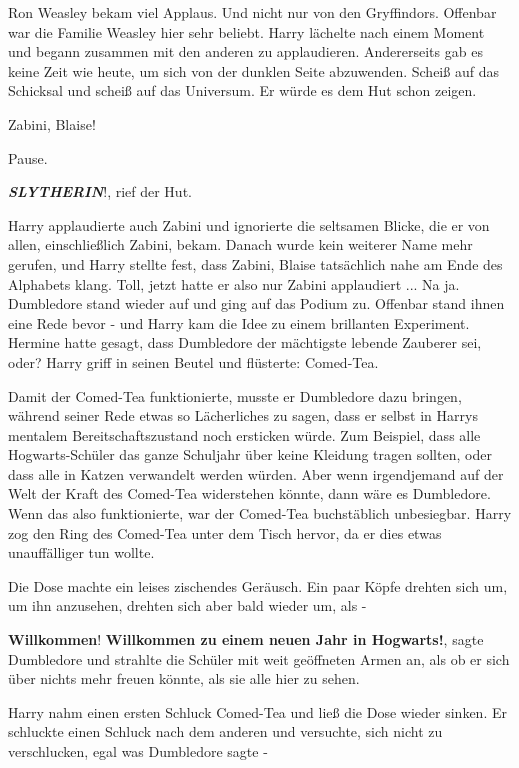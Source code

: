 Ron Weasley bekam viel Applaus. Und nicht nur von den Gryffindors. Offenbar war
die Familie Weasley hier sehr beliebt. Harry lächelte nach einem Moment und
begann zusammen mit den anderen zu applaudieren. Andererseits gab es keine Zeit
wie heute, um sich von der dunklen Seite abzuwenden. Scheiß auf das Schicksal
und scheiß auf das Universum. Er würde es dem Hut schon zeigen.

\glqq{}Zabini, Blaise!\grqq{}

Pause.

\glqq{}\textbf{\emph{SLYTHERIN}}!\grqq{}, rief der Hut.

Harry applaudierte auch Zabini und ignorierte die seltsamen Blicke, die er von
allen, einschließlich Zabini, bekam. Danach wurde kein weiterer Name mehr
gerufen, und Harry stellte fest, dass \glqq{}Zabini, Blaise\grqq{} tatsächlich
nahe am Ende des Alphabets klang. Toll, jetzt hatte er also nur Zabini
applaudiert ... Na ja. Dumbledore stand wieder auf und ging auf das Podium zu.
Offenbar stand ihnen eine Rede bevor - und Harry kam die Idee zu einem
brillanten Experiment. Hermine hatte gesagt, dass Dumbledore der mächtigste
lebende Zauberer sei, oder? Harry griff in seinen Beutel und flüsterte: \glqq{}
Comed-Tea\grqq{}.

Damit der Comed-Tea funktionierte, musste er Dumbledore dazu bringen, während
seiner Rede etwas so Lächerliches zu sagen, dass er selbst in Harrys mentalem
Bereitschaftszustand noch ersticken würde. Zum Beispiel, dass alle
Hogwarts-Schüler das ganze Schuljahr über keine Kleidung tragen sollten, oder
dass alle in Katzen verwandelt werden würden. Aber wenn irgendjemand auf der
Welt der Kraft des Comed-Tea widerstehen könnte, dann wäre es Dumbledore. Wenn
das also funktionierte, war der Comed-Tea buchstäblich unbesiegbar. Harry zog
den Ring des Comed-Tea unter dem Tisch hervor, da er dies etwas unauffälliger
tun wollte.

Die Dose machte ein leises zischendes Geräusch. Ein paar Köpfe drehten sich um,
um ihn anzusehen, drehten sich aber bald wieder um, als -

\glqq{}\textbf{Willkommen}! \textbf{Willkommen zu einem neuen Jahr in
Hogwarts!}\grqq{}, sagte Dumbledore und strahlte die Schüler mit weit geöffneten
Armen an, als ob er sich über nichts mehr freuen könnte, als sie alle hier zu
sehen.

Harry nahm einen ersten Schluck Comed-Tea und ließ die Dose wieder sinken. Er
schluckte einen Schluck nach dem anderen und versuchte, sich nicht zu
verschlucken, egal was Dumbledore sagte -

